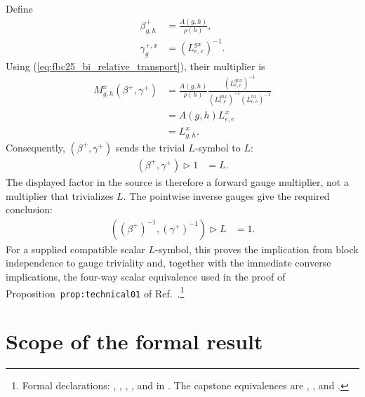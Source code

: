 \documentclass{article}
\begin{document}
Define
\begin{align}
    \beta^+_{g,h}
        &=\frac{A(g,h)}{\rho(h)},
    \label{eq:fbc25_bi_forward_fusion_gauge}\\
    \gamma^{+,x}_g
        &=(L^{g x}_{e,e})^{-1}.
    \label{eq:fbc25_bi_forward_action_gauge}
\end{align}
Using (\ref{eq:fbc25_bi_relative_transport}), their multiplier is
\begin{align}
    M^x_{g,h}(\beta^+,\gamma^+)
        &=\frac{A(g,h)}{\rho(h)}
          \frac{(L^{ghx}_{e,e})^{-1}}
          {(L^{ghx}_{e,e})^{-1}(L^{hx}_{e,e})^{-1}}
    \label{eq:fbc25_bi_forward_multiplier_first}\\
        &=A(g,h)L^x_{e,e}
    \label{eq:fbc25_bi_forward_multiplier_second}\\
        &=L^x_{g,h}.
    \label{eq:fbc25_bi_forward_multiplier_lsymbol}
\end{align}
Consequently, $(\beta^+,\gamma^+)$ sends the trivial $L$-symbol to $L$:
\begin{align}
    (\beta^+,\gamma^+)\mathbin{\triangleright}1
        &=L.
    \label{eq:fbc25_bi_forward_gauge_produces_lsymbol}
\end{align}
The displayed factor in the source is therefore a forward gauge multiplier,
not a multiplier that trivializes $L$. The pointwise inverse gauges give the
required conclusion:
\begin{align}
    ((\beta^+)^{-1},(\gamma^+)^{-1})
        \mathbin{\triangleright}L
        &=1.
    \label{eq:fbc25_bi_inverse_gauge_trivializes_lsymbol}
\end{align}
For a supplied compatible scalar $L$-symbol, this proves the implication from
block independence to gauge triviality and, together with the immediate
converse implications, the four-way scalar equivalence used in the proof of
Proposition~\texttt{prop:technical01} of
Ref.~\cite{FrancoRubio2025MPUGauging}.\footnote{Formal declarations:
,
,
,
, and
 in
. The capstone equivalences
are ,
, and
.}

\section{Scope of the formal result}
\end{document}
